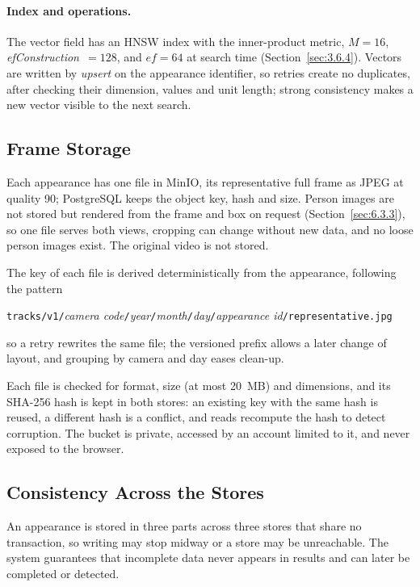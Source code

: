 \paragraph{Index and operations.} The vector field has an HNSW index with the inner-product metric, $M = 16$, \textit{ef\-Con\-struc\-tion}~$= 128$, and $\mathit{ef} = 64$ at search time (Section~\ref{sec:3.6.4}). Vectors are written by \emph{upsert} on the appearance identifier, so retries create no duplicates, after checking their dimension, values and unit length; strong consistency makes a new vector visible to the next search.

\subsection{Frame Storage}
\label{sec:5.3.3}

Each appearance has one file in MinIO, its representative full frame as JPEG at quality 90; PostgreSQL keeps the object key, hash and size. Person images are not stored but rendered from the frame and box on request (Section~\ref{sec:6.3.3}), so one file serves both views, cropping can change without new data, and no loose person images exist. The original video is not stored.

The key of each file is derived deterministically from the appearance, following the pattern
\begin{center}
\texttt{tracks/v1/}\allowbreak \textit{camera code}\texttt{/}\allowbreak \textit{year}\texttt{/}\allowbreak \textit{month}\texttt{/}\allowbreak \textit{day}\texttt{/}\allowbreak \textit{appearance id}\texttt{/}\allowbreak \texttt{representative.jpg}
\end{center}
so a retry rewrites the same file; the versioned prefix allows a later change of layout, and grouping by camera and day eases clean-up.

Each file is checked for format, size (at most 20~MB) and dimensions, and its SHA-256 hash is kept in both stores: an existing key with the same hash is reused, a different hash is a conflict, and reads recompute the hash to detect corruption. The bucket is private, accessed by an account limited to it, and never exposed to the browser.

\subsection{Consistency Across the Stores}
\label{sec:5.3.4}

An appearance is stored in three parts across three stores that share no transaction, so writing may stop midway or a store may be unreachable. The system guarantees that incomplete data never appears in results and can later be completed or detected.

